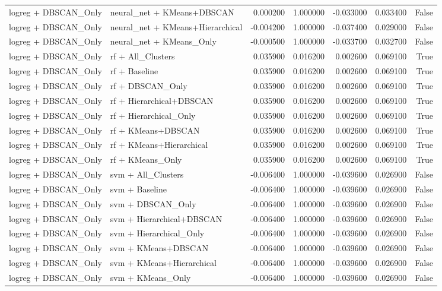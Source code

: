 \begin{tabular}{llrrrrr}
logreg + DBSCAN_Only & neural_net + KMeans+DBSCAN & 0.000200 & 1.000000 & -0.033000 & 0.033400 & False \\
logreg + DBSCAN_Only & neural_net + KMeans+Hierarchical & -0.004200 & 1.000000 & -0.037400 & 0.029000 & False \\
logreg + DBSCAN_Only & neural_net + KMeans_Only & -0.000500 & 1.000000 & -0.033700 & 0.032700 & False \\
logreg + DBSCAN_Only & rf + All_Clusters & 0.035900 & 0.016200 & 0.002600 & 0.069100 & True \\
logreg + DBSCAN_Only & rf + Baseline & 0.035900 & 0.016200 & 0.002600 & 0.069100 & True \\
logreg + DBSCAN_Only & rf + DBSCAN_Only & 0.035900 & 0.016200 & 0.002600 & 0.069100 & True \\
logreg + DBSCAN_Only & rf + Hierarchical+DBSCAN & 0.035900 & 0.016200 & 0.002600 & 0.069100 & True \\
logreg + DBSCAN_Only & rf + Hierarchical_Only & 0.035900 & 0.016200 & 0.002600 & 0.069100 & True \\
logreg + DBSCAN_Only & rf + KMeans+DBSCAN & 0.035900 & 0.016200 & 0.002600 & 0.069100 & True \\
logreg + DBSCAN_Only & rf + KMeans+Hierarchical & 0.035900 & 0.016200 & 0.002600 & 0.069100 & True \\
logreg + DBSCAN_Only & rf + KMeans_Only & 0.035900 & 0.016200 & 0.002600 & 0.069100 & True \\
logreg + DBSCAN_Only & svm + All_Clusters & -0.006400 & 1.000000 & -0.039600 & 0.026900 & False \\
logreg + DBSCAN_Only & svm + Baseline & -0.006400 & 1.000000 & -0.039600 & 0.026900 & False \\
logreg + DBSCAN_Only & svm + DBSCAN_Only & -0.006400 & 1.000000 & -0.039600 & 0.026900 & False \\
logreg + DBSCAN_Only & svm + Hierarchical+DBSCAN & -0.006400 & 1.000000 & -0.039600 & 0.026900 & False \\
logreg + DBSCAN_Only & svm + Hierarchical_Only & -0.006400 & 1.000000 & -0.039600 & 0.026900 & False \\
logreg + DBSCAN_Only & svm + KMeans+DBSCAN & -0.006400 & 1.000000 & -0.039600 & 0.026900 & False \\
logreg + DBSCAN_Only & svm + KMeans+Hierarchical & -0.006400 & 1.000000 & -0.039600 & 0.026900 & False \\
logreg + DBSCAN_Only & svm + KMeans_Only & -0.006400 & 1.000000 & -0.039600 & 0.026900 & False \\

\end{tabular}
